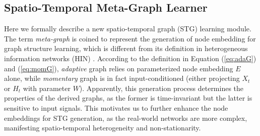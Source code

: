 \documentclass[letterpaper]{article} \usepackage{aaai23}  \usepackage{times}  \usepackage{helvet}  \usepackage{courier}  \usepackage[hyphens]{url}  \usepackage{graphicx} \urlstyle{rm} \def\UrlFont{\rm}  \usepackage{natbib}  \usepackage{caption} \usepackage{multirow}
\begin{document}
\subsection{Spatio-Temporal Meta-Graph Learner}
Here we formally describe a new spatio-temporal graph (STG) learning module. The term \textit{meta-graph} is coined to represent the generation of node embedding for graph structure learning, which is different from its definition in heterogeneous information networks (HIN) \cite{zhao2017meta, ding2021diffmg}. According to the definition in Equation (\ref{eq:adaG}) and (\ref{eq:momG}), \textit{adaptive} graph relies on parameterized node embedding $E$ alone, while \textit{momentary} graph is in fact input-conditioned (either projecting $X_t$ or $H_t$ with parameter $W$). Apparently, this generation process determines the properties of the derived graphs, as the former is time-invariant but the latter is sensitive to input signals. This motivates us to further enhance the node embeddings for STG generation, as the real-world networks are more complex, manifesting spatio-temporal heterogeneity and non-stationarity.
\end{document}
